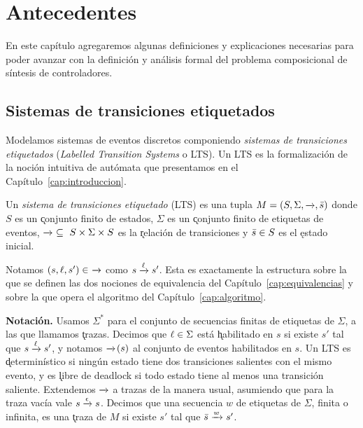 \chapter{Antecedentes}
\label{cap:antecedentes}

En este capítulo agregaremos algunas definiciones y explicaciones necesarias para poder avanzar con la definición y análisis formal del problema composicional de síntesis de controladores.


\section{Sistemas de transiciones etiquetados}
\label{sec:lts}

Modelamos sistemas de eventos discretos componiendo \textit{sistemas de transiciones
etiquetados} (\textit{Labelled Transition Systems} o LTS). Un LTS es la formalización de la
noción intuitiva de autómata que presentamos en el Capítulo~\ref{cap:introduccion}.

\begin{definition}[LTS]
\label{def:lts}
Un \textit{sistema de transiciones etiquetado} (LTS) es una tupla
$M = (S, \Sigma, \pijl{}, \init{s})$ donde $S$ es un \k{conjunto finito de estados},
$\Sigma$ es un \k{conjunto finito de etiquetas de eventos}, $\pijl{} \ \C \ S \x \Sigma \x S$
es la \k{relación de transiciones} y $\bar{s} \in S$ es el \k{estado inicial}.
\end{definition}

Notamos $(s, \l, s') \in \ \pijl{}$ como $s \pijl{\l} s'$. Esta es exactamente la estructura
sobre la que se definen las dos nociones de equivalencia del Capítulo~\ref{cap:equivalencias} y
sobre la que opera el algoritmo del Capítulo~\ref{cap:algoritmo}.

\medskip

\noindent\textbf{Notación.} Usamos $\Sigma^{*}$ para el conjunto de secuencias finitas de
etiquetas de $\Sigma$, a las que llamamos \k{trazas}. Decimos que $\ell \in \Sigma$ está
\k{habilitado} en $s$ si existe $s'$ tal que $s \pijl{\l} s'$, y notamos $\pijl{}\!(s)$ al
conjunto de eventos habilitados en $s$. Un LTS es \k{determinístico} si ningún estado tiene dos
transiciones salientes con el mismo evento, y es \k{libre de deadlock} si todo estado tiene al
menos una transición saliente. Extendemos $\pijl{}$ a trazas de la manera usual, asumiendo que
para la traza vacía vale $s \pijl{\epsilon} s$. Decimos que una secuencia $w$ de etiquetas de
$\Sigma$, finita o infinita, es una \k{traza de $M$} si existe $s'$ tal que
$\init{s} \pijl{w} s'$.

